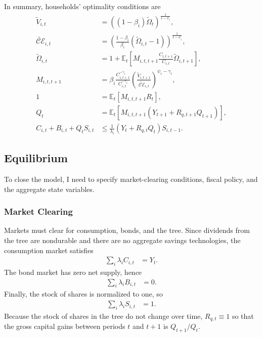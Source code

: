 \documentclass[12 pt, oneside]{article}
\theoremstyle{definition}
\theoremstyle{definition}
\theoremstyle{definition}
\newcommand{\E}{\mathbb{E}}
\newcommand{\calC}{\mathcal{C}}
\newcommand{\calE}{\mathcal{E}}
\begin{document}
In summary, households' optimality conditions are
\begin{align}
  \label{eq:epstein zin defn}
  \tilde{V}_{i, t} & = ((1 - \beta_i)\tilde{\Omega}_t)^{\frac{1}{1 - \psi_i}},\\
  \label{eq:certainty equivalent}
  \tilde{\calC\calE}_{i, t} & = \left(\frac{1 - \beta_i}{\beta_i}(\tilde{\Omega}_{i, t} - 1)\right)^{\frac{1}{1 - \psi_i}},\\
  \label{eq:epstein zin wealth recursion}
  \tilde{\Omega}_{i, t} & = 1 + \E_t\left[M_{i, t, t + 1}\frac{C_{i, t + 1}}{C_{i, t}}\tilde{\Omega}_{i, t + 1}\right],\\
  \label{eq:stochastic discount factor}
  M_{i, t, t + 1} & = \beta_i \frac{C_{i, t + 1}^{- \gamma_i }}{C_{i, t}^{-\gamma_i}}\left(\frac{\tilde{V}_{i, t + 1}}{\tilde{\calC\calE}_{i, t}}\right)^{ \psi_i - \gamma_i},\\
  \label{eq:euler eqn}
  1 & = \E_t\left[M_{i, t, t + 1}R_t\right],\\
  \label{eq:tree asset pricing}
  Q_t & = \E_t\left[M_{i, t, t + 1} \left(Y_{t + 1} + R_{q, t + 1}Q_{t + 1}\right)\right],\\
  \label{eq:hh budget constraint}
  C_{i, t} + B_{i, t} + Q_t S_{i, t} & \leq \frac{1}{\lambda_i}\left(Y_t + R_{q, t}Q_t\right)S_{i, t - 1}.
\end{align}


\subsection{Equilibrium}
To close the model, I need to specify market-clearing conditions, fiscal policy, and the aggregate state variables.\\

\subsubsection{Market Clearing}
Markets must clear for consumption, bonds, and the tree. Since dividends from the tree are nondurable and there are no aggregate savings technologies, the consumption market satisfies
\begin{align}\label{eq:consumption market clearing}
  \sum_i \lambda_i C_{i, t} & = Y_t.
\end{align}
The bond market has zero net supply, hence
\begin{align}\label{eq:bond market clearing}
  \sum_i \lambda_i B_{i, t} & = 0.
\end{align}
Finally, the stock of shares is normalized to one, so
\begin{align}\label{eq:bond market clearing}
  \sum_i \lambda_i S_{i, t} & = 1.
\end{align}
Because the stock of shares in the tree do not change over time, $R_{q, t} \equiv 1$ so that the gross capital gains between periods $t$ and $t + 1$ is $Q_{t + 1} / Q_t$.
\end{document}
